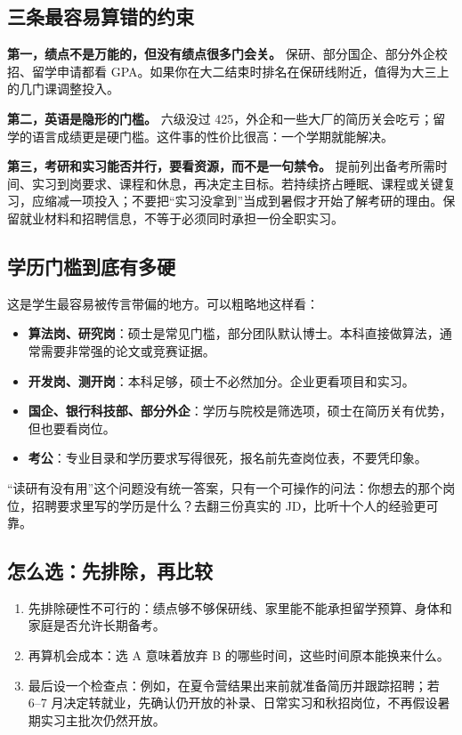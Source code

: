 \documentclass[UTF8,zihao=5,openany]{ctexbook}
\begin{document}
\subsection{三条最容易算错的约束}
\textbf{第一，绩点不是万能的，但没有绩点很多门会关。} 保研、部分国企、部分外企校招、留学申请都看 GPA。如果你在大二结束时排名在保研线附近，值得为大三上的几门课调整投入。

\textbf{第二，英语是隐形的门槛。} 六级没过 425，外企和一些大厂的简历关会吃亏；留学的语言成绩更是硬门槛。这件事的性价比很高：一个学期就能解决。

\textbf{第三，考研和实习能否并行，要看资源，而不是一句禁令。} 提前列出备考所需时间、实习到岗要求、课程和休息，再决定主目标。若持续挤占睡眠、课程或关键复习，应缩减一项投入；不要把“实习没拿到”当成到暑假才开始了解考研的理由。保留就业材料和招聘信息，不等于必须同时承担一份全职实习。

\subsection{学历门槛到底有多硬}
这是学生最容易被传言带偏的地方。可以粗略地这样看：

\begin{itemize}
\item \textbf{算法岗、研究岗}：硕士是常见门槛，部分团队默认博士。本科直接做算法，通常需要非常强的论文或竞赛证据。
\item \textbf{开发岗、测开岗}：本科足够，硕士不必然加分。企业更看项目和实习。
\item \textbf{国企、银行科技部、部分外企}：学历与院校是筛选项，硕士在简历关有优势，但也要看岗位。
\item \textbf{考公}：专业目录和学历要求写得很死，报名前先查岗位表，不要凭印象。
\end{itemize}

“读研有没有用”这个问题没有统一答案，只有一个可操作的问法：你想去的那个岗位，招聘要求里写的学历是什么？去翻三份真实的 JD，比听十个人的经验更可靠。

\subsection{怎么选：先排除，再比较}
\begin{enumerate}
\item 先排除硬性不可行的：绩点够不够保研线、家里能不能承担留学预算、身体和家庭是否允许长期备考。
\item 再算机会成本：选 A 意味着放弃 B 的哪些时间，这些时间原本能换来什么。
\item 最后设一个检查点：例如，在夏令营结果出来前就准备简历并跟踪招聘；若 6--7 月决定转就业，先确认仍开放的补录、日常实习和秋招岗位，不再假设暑期实习主批次仍然开放。
\end{enumerate}
\end{document}
